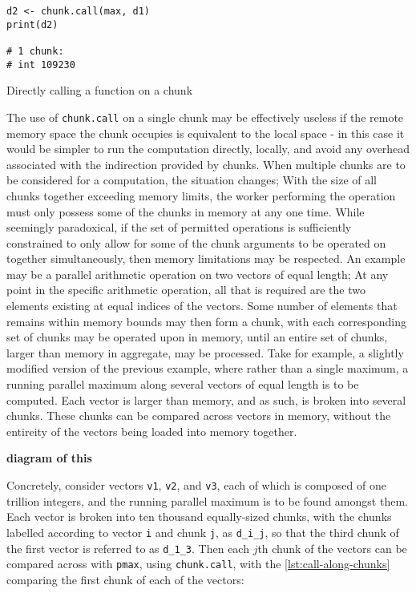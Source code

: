 \begin{listing}
    \begin{verbatim}
d2 <- chunk.call(max, d1)
print(d2)

# 1 chunk:
# int 109230
    \end{verbatim}
    \caption{Directly calling a function on a chunk}
    \label{lst:chunk-call}
\end{listing}

The use of \texttt{chunk.call} on a single chunk may be effectively
useless if the remote memory space the chunk occupies is equivalent to
the local space - in this case it would be simpler to run the
computation directly, locally, and avoid any overhead associated with
the indirection provided by chunks. When multiple chunks are to be
considered for a computation, the situation changes; With the size of
all chunks together exceeding memory limits, the worker performing the
operation must only possess some of the chunks in memory at any one
time. While seemingly paradoxical, if the set of permitted operations is
sufficiently constrained to only allow for some of the chunk arguments
to be operated on together simultaneously, then memory limitations may
be respected. An example may be a parallel arithmetic operation on two
vectors of equal length; At any point in the specific arithmetic
operation, all that is required are the two elements existing at equal
indices of the vectors. Some number of elements that remains within
memory bounds may then form a chunk, with each corresponding set of
chunks may be operated upon in memory, until an entire set of chunks,
larger than memory in aggregate, may be processed. Take for example, a
slightly modified version of the previous example, where rather than a
single maximum, a running parallel maximum along several vectors of
equal length is to be computed. Each vector is larger than memory, and
as such, is broken into several chunks. These chunks can be compared
across vectors in memory, without the entireity of the vectors being
loaded into memory together.

\textbf{diagram of this}

Concretely, consider vectors \texttt{v1}, \texttt{v2}, and \texttt{v3},
each of which is composed of one trillion integers, and the running
parallel maximum is to be found amongst them. Each vector is broken into
ten thousand equally-sized chunks, with the chunks labelled according to
vector \texttt{i} and chunk \texttt{j}, as \texttt{d\_i\_j}, so that the
third chunk of the first vector is referred to as \texttt{d\_1\_3}. Then
each \(j\)th chunk of the vectors can be compared across with
\texttt{pmax}, using \texttt{chunk.call}, with the \ref{lst:call-along-chunks}
comparing the first chunk of each of the vectors:

